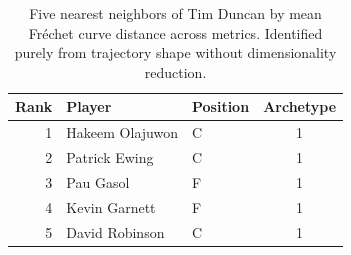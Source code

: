 \begin{table}[htbp]
  \centering\small
  \begin{tabular}{rllc}
    \toprule
    Rank & Player & Position & Archetype \\
    \midrule
    1 & Hakeem Olajuwon & C & 1 \\
    2 & Patrick Ewing & C & 1 \\
    3 & Pau Gasol & F & 1 \\
    4 & Kevin Garnett & F & 1 \\
    5 & David Robinson & C & 1 \\
    \bottomrule
  \end{tabular}
  \caption{Five nearest neighbors of Tim Duncan by mean Fr\'{e}chet curve distance across metrics. Identified purely from trajectory shape without dimensionality reduction.}
  \label{tab:Tim_Duncan_frechet_curve_neighbors}
\end{table}

